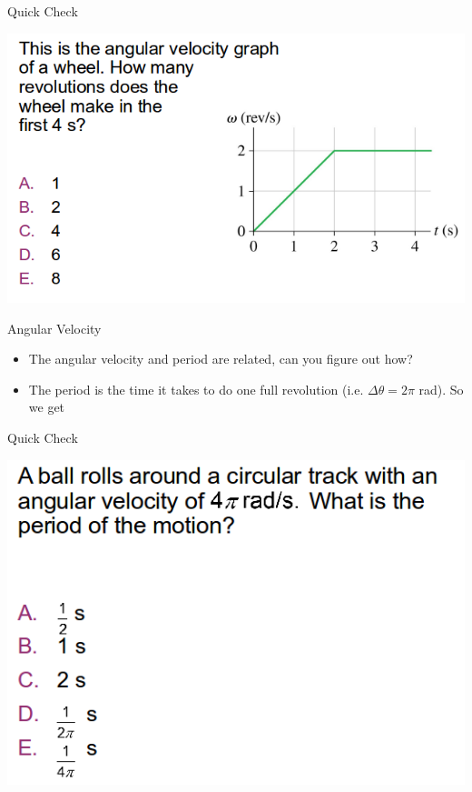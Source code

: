 \documentclass{beamer}
\newcommand{\red}[1]{{\color{red}{#1}}}
\newcommand{\checkL}[2]{\begin{textblock*}{1cm}(#1,#2){\Large \red{\Checkmark}}\end{textblock*}}
\begin{document}
\begin{frame}{Quick Check}
\begin{center}
   \includegraphics[width=\textwidth]{../figures/QC4_7.png}
\end{center}
\only<2>{\checkL{0.9cm}{6.5cm}}
\end{frame}

\begin{frame}{Angular Velocity}
\begin{itemize}
   \item The angular velocity and period are related, can you figure out how?
   \item<2-> The period is the time it takes to do one full revolution (i.e. $\Delta\theta=2\pi$ rad). So we get
\end{itemize}
\end{frame}

\begin{frame}{Quick Check}
\begin{center}
   \includegraphics[width=\textwidth]{../figures/QC4_8.png}
\end{center}
\only<2>{\checkL{0.9cm}{4.3cm}}
\end{frame}
\end{document}

